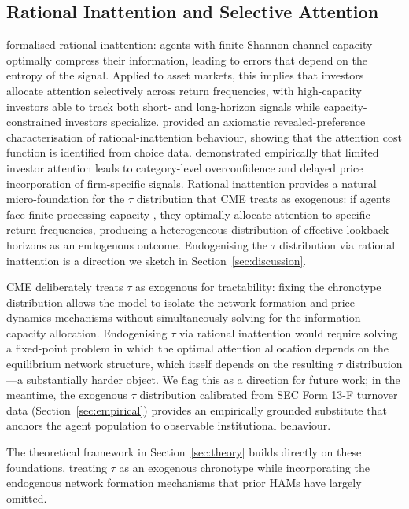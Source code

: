 \documentclass[10pt,twocolumn]{article}
\begin{document}
\subsection{Rational Inattention and Selective Attention}

\cite{sims2003} formalised rational inattention: agents with finite
Shannon channel capacity optimally compress their information, leading
to errors that depend on the entropy of the signal.  Applied to asset
markets, this implies that investors allocate attention selectively across
return frequencies, with high-capacity investors able to track both short-
and long-horizon signals while capacity-constrained investors specialize.
\cite{caplin2015} provided an axiomatic revealed-preference characterisation
of rational-inattention behaviour, showing that the attention cost function
is identified from choice data.  \cite{peng2006} demonstrated empirically
that limited investor attention leads to category-level overconfidence and
delayed price incorporation of firm-specific signals.  Rational inattention
provides a natural micro-foundation for the $\tau$ distribution that CME
treats as exogenous: if agents face finite processing capacity
\cite{sims2003}, they optimally allocate attention to specific return
frequencies, producing a heterogeneous distribution of effective lookback
horizons as an endogenous outcome.  Endogenising the $\tau$ distribution
via rational inattention is a direction we sketch in
Section~\ref{sec:discussion}.

CME deliberately treats $\tau$ as exogenous for tractability: fixing the
chronotype distribution allows the model to isolate the network-formation
and price-dynamics mechanisms without simultaneously solving for the
information-capacity allocation.  Endogenising $\tau$ via rational
inattention would require solving a fixed-point problem in which the
optimal attention allocation depends on the equilibrium network structure,
which itself depends on the resulting $\tau$ distribution---a substantially
harder object.  We flag this as a direction for future work; in the
meantime, the exogenous $\tau$ distribution calibrated from SEC Form 13-F
turnover data (Section~\ref{sec:empirical}) provides an empirically grounded
substitute that anchors the agent population to observable institutional
behaviour.

The theoretical framework in Section~\ref{sec:theory} builds directly on
these foundations, treating $\tau$ as an exogenous chronotype while
incorporating the endogenous network formation mechanisms that prior HAMs
have largely omitted.
\end{document}
